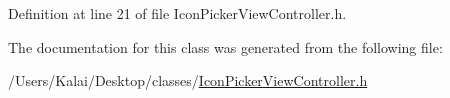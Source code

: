 Definition at line 21 of file Icon\-Picker\-View\-Controller.\-h.



The documentation for this class was generated from the following file\-:\begin{DoxyCompactItemize}
\item 
/\-Users/\-Kalai/\-Desktop/classes/\hyperlink{_icon_picker_view_controller_8h}{Icon\-Picker\-View\-Controller.\-h}\end{DoxyCompactItemize}
